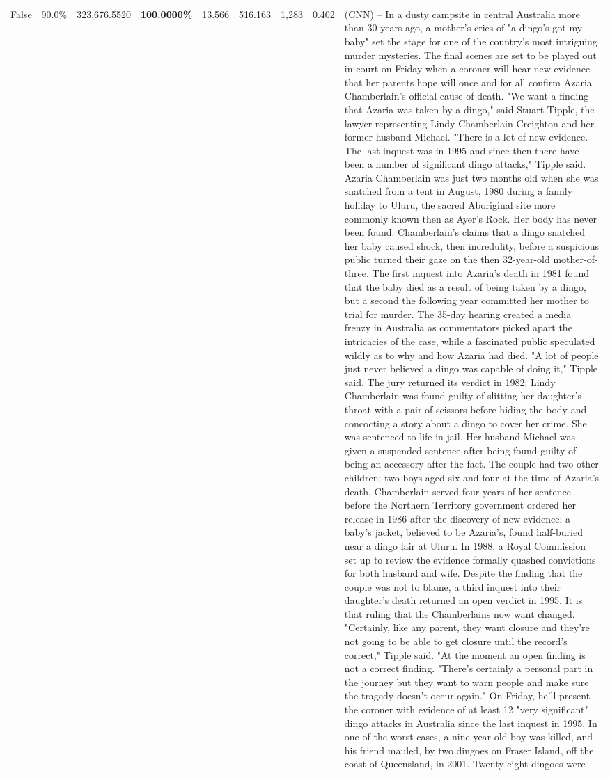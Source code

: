 \begin{table}[H]
\begin{tabular}{lllrlllll}
False & 90.0\% & 323,676.5520 & \bfseries \color{red} 100.0000\% & 13.566 & 516.163 & 1,283 & 0.402 & (CNN) -- In a dusty campsite in central Australia more than 30 years ago, a mother's cries of "a dingo's got my baby" set the stage for one of the country's most intriguing murder mysteries. The final scenes are set to be played out in court on Friday when a coroner will hear new evidence that her parents hope will once and for all confirm Azaria Chamberlain's official cause of death. "We want a finding that Azaria was taken by a dingo," said Stuart Tipple, the lawyer representing Lindy Chamberlain-Creighton and her former husband Michael. "There is a lot of new evidence. The last inquest was in 1995 and since then there have been a number of significant dingo attacks," Tipple said. Azaria Chamberlain was just two months old when she was snatched from a tent in August, 1980 during a family holiday to Uluru, the sacred Aboriginal site more commonly known then as Ayer's Rock. Her body has never been found. Chamberlain's claims that a dingo snatched her baby caused shock, then incredulity, before a suspicious public turned their gaze on the then 32-year-old mother-of-three. The first inquest into Azaria's death in 1981 found that the baby died as a result of being taken by a dingo, but a second the following year committed her mother to trial for murder. The 35-day hearing created a media frenzy in Australia as commentators picked apart the intricacies of the case, while a fascinated public speculated wildly as to why and how Azaria had died. "A lot of people just never believed a dingo was capable of doing it," Tipple said. The jury returned its verdict in 1982; Lindy Chamberlain was found guilty of slitting her daughter's throat with a pair of scissors before hiding the body and concocting a story about a dingo to cover her crime. She was sentenced to life in jail. Her husband Michael was given a suspended sentence after being found guilty of being an accessory after the fact. The couple had two other children; two boys aged six and four at the time of Azaria's death. Chamberlain served four years of her sentence before the Northern Territory government ordered her release in 1986 after the discovery of new evidence; a baby's jacket, believed to be Azaria's, found half-buried near a dingo lair at Uluru. In 1988, a Royal Commission set up to review the evidence formally quashed convictions for both husband and wife. Despite the finding that the couple was not to blame, a third inquest into their daughter's death returned an open verdict in 1995. It is that ruling that the Chamberlains now want changed. "Certainly, like any parent, they want closure and they're not going to be able to get closure until the record's correct," Tipple said. "At the moment an open finding is not a correct finding. "There's certainly a personal part in the journey but they want to warn people and make sure the tragedy doesn't occur again." On Friday, he'll present the coroner with evidence of at least 12 "very significant" dingo attacks in Australia since the last inquest in 1995. In one of the worst cases, a nine-year-old boy was killed, and his friend mauled, by two dingoes on Fraser Island, off the coast of Queensland, in 2001. Twenty-eight dingoes were 
\end{tabular}
\end{table}
